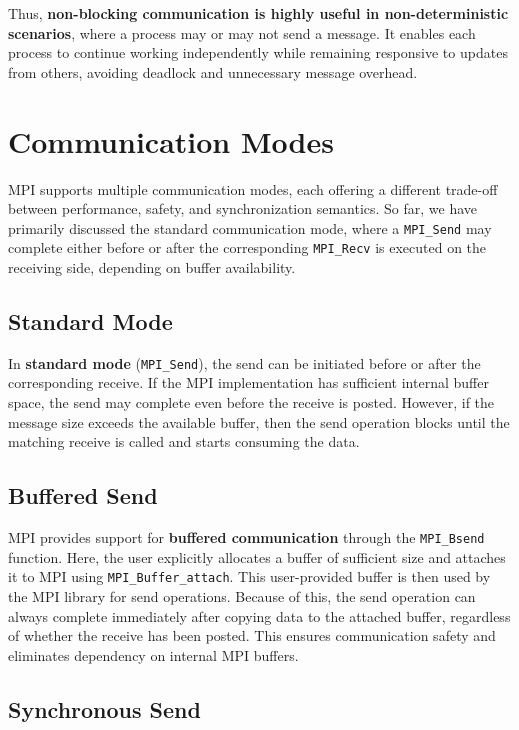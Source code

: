 \documentclass[12pt]{book}
\begin{document}
Thus, \textbf{non-blocking communication is highly useful in non-deterministic scenarios}, where a process may or may not send a message. It enables each process to continue working independently while remaining responsive to updates from others, avoiding deadlock and unnecessary message overhead.

\section{Communication Modes}

MPI supports multiple communication modes, each offering a different trade-off between performance, safety, and synchronization semantics. So far, we have primarily discussed the standard communication mode, where a \texttt{MPI\_Send} may complete either before or after the corresponding \texttt{MPI\_Recv} is executed on the receiving side, depending on buffer availability.

\subsection*{Standard Mode}

In \textbf{standard mode} (\texttt{MPI\_Send}), the send can be initiated before or after the corresponding receive. If the MPI implementation has sufficient internal buffer space, the send may complete even before the receive is posted. However, if the message size exceeds the available buffer, then the send operation blocks until the matching receive is called and starts consuming the data.

\subsection*{Buffered Send}

MPI provides support for \textbf{buffered communication} through the \texttt{MPI\_Bsend} function. Here, the user explicitly allocates a buffer of sufficient size and attaches it to MPI using \texttt{MPI\_Buffer\_attach}. This user-provided buffer is then used by the MPI library for send operations. Because of this, the send operation can always complete immediately after copying data to the attached buffer, regardless of whether the receive has been posted. This ensures communication safety and eliminates dependency on internal MPI buffers.

\subsection*{Synchronous Send}
\end{document}
